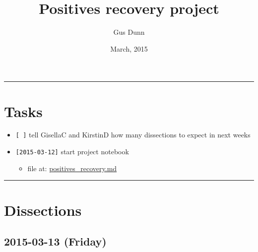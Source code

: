\documentclass[letterpaper]{scrartcl}
\title{Positives recovery project\\\vspace{0.5em}{\large Caccone PostDoc}}
\author{Gus Dunn}
\date{March, 2015}
\begin{document}
\maketitle

{
\hypersetup{linkcolor=black}
\setcounter{tocdepth}{3}
\tableofcontents
}
\begin{center}\rule{0.5\linewidth}{\linethickness}\end{center}

\newpage

\section{Tasks}\label{tasks}

\begin{itemize}
\itemsep1pt\parskip0pt
\item
  \texttt{{[} {]}} tell GisellaC and KirstinD how many dissections to
  expect in next weeks
\item
  \texttt{{[}2015-03-12{]}} start project notebook

  \begin{itemize}
  \itemsep1pt\parskip0pt
  \item
    file at:
    \href{file:///home/gus/Dropbox/repos/git/markdown-docs/notes/projects/positives_recovery/positives_recovery.md}{positives\_recovery.md}
  \end{itemize}
\end{itemize}

\begin{center}\rule{0.5\linewidth}{\linethickness}\end{center}

\section{Dissections}\label{dissections}

\subsection{2015-03-13 (Friday)}\label{friday}
\end{document}
